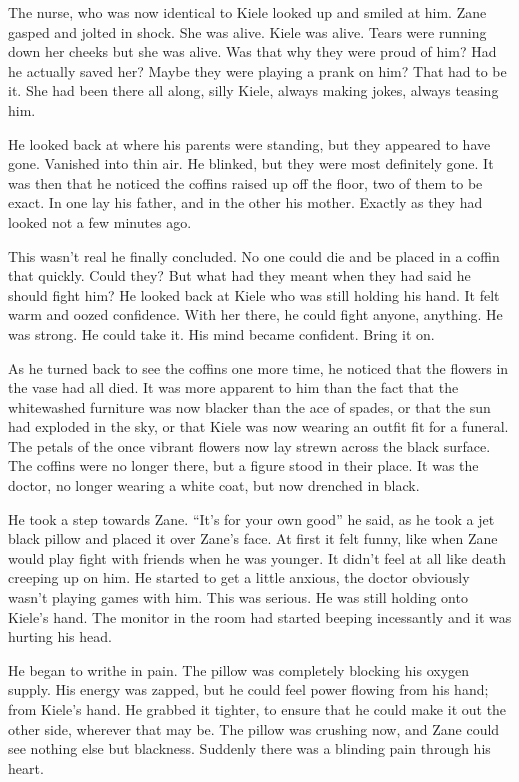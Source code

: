 The nurse, who was now identical to Kiele looked up and smiled at him.  Zane gasped and jolted in shock.  She was alive.  Kiele was alive.  Tears were running down her cheeks but she was alive.  Was that why they were proud of him?  Had he actually saved her?  Maybe they were playing a prank on him?  That had to be it.  She had been there all along, silly Kiele, always making jokes, always teasing him.

He looked back at where his parents were standing, but they appeared to have gone.  Vanished into thin air.  He blinked, but they were most definitely gone.  It was then that he noticed the coffins raised up off the floor, two of them to be exact.  In one lay his father, and in the other his mother.  Exactly as they had looked not a few minutes ago.  

This wasn't real he finally concluded.  No one could die and be placed in a coffin that quickly.  Could they?  But what had they meant when they had said he should fight him?  He looked back at Kiele who was still holding his hand.  It felt warm and oozed confidence.  With her there, he could fight anyone, anything.  He was strong.  He could take it.  His mind became confident.  Bring it on.  

As he turned back to see the coffins one more time, he noticed that the flowers in the vase had all died.  It was more apparent to him than the fact that the whitewashed furniture was now blacker than the ace of spades, or that the sun had exploded in the sky, or that Kiele was now wearing an outfit fit for a funeral.  The petals of the once vibrant flowers now lay strewn across the black surface.  The coffins were no longer there, but a figure stood in their place.  It was the doctor, no longer wearing a white coat, but now drenched in black.

He took a step towards Zane.  ``It's for your own good'' he said, as he took a jet black pillow and placed it over Zane's face.  At first it felt funny, like when Zane would play fight with friends when he was younger.  It didn't feel at all like death creeping up on him.  He started to get a little anxious, the doctor obviously wasn't playing games with him.  This was serious.  He was still holding onto Kiele's hand.  The monitor in the room had started beeping incessantly and it was hurting his head.

He began to writhe in pain.  The pillow was completely blocking his oxygen supply.  His energy was zapped, but he could feel power flowing from his hand; from Kiele's hand.  He grabbed it tighter, to ensure that he could make it out the other side, wherever that may be.  The pillow was crushing now, and Zane could see nothing else but blackness.  Suddenly there was a blinding pain through his heart.  

